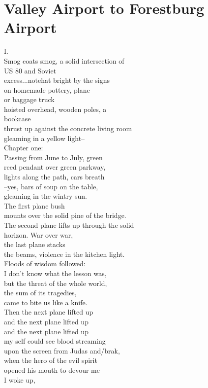 \documentclass[smalldemyvopaper,11pt,twoside,onecolumn,openright,extrafontsizes]{memoir}
\begin{document}
\chapter{Valley Airport to Forestburg Airport}
I.
\\Smog coats smog, a solid intersection of
\\US 80 and Soviet
\\excess...notehat bright by the signs
\\on homemade pottery, plane
\\or baggage truck
\\hoisted overhead, wooden poles, a
\\bookcase
\\thrust up against the concrete living room
\\gleaming in a yellow light--
\\Chapter one:
\\Passing from June to July, green
\\reed pendant over green parkway,
\\lights along the path, cars breath
\\--yes, bars of soup on the table,
\\gleaming in the wintry sun.
\\The first plane bush
\\mounts over the solid pine of the bridge.
\\The second plane lifts up through the solid
\\horizon. War over war,
\\the last plane stacks
\\the beams, violence in the kitchen light.
\\Floods of wisdom followed:
\\I don't know what the lesson was,
\\but the threat of the whole world,
\\the sum of its tragedies,
\\came to bite us like a knife.
\\Then the next plane lifted up
\\and the next plane lifted up
\\and the next plane lifted up
\\my self could see blood streaming
\\upon the screen from Judas and/brak,
\\when the hero of the evil spirit
\\opened his mouth to devour me
\\I woke up,
\end{document}
